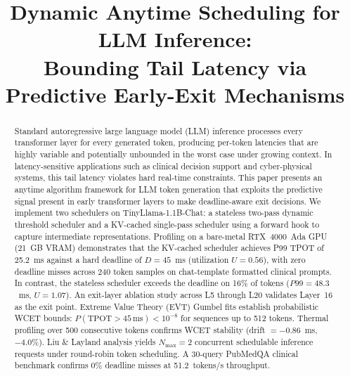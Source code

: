 \documentclass[conference]{IEEEtran}
\begin{document}
\title{Dynamic Anytime Scheduling for LLM Inference:\\
Bounding Tail Latency via Predictive Early-Exit Mechanisms}

\author{
}

\maketitle

\begin{abstract}
Standard autoregressive large language model (LLM) inference processes every transformer layer for every generated token, producing per-token latencies that are highly variable and potentially unbounded in the worst case under growing context. In latency-sensitive applications such as clinical decision support and cyber-physical systems, this tail latency violates hard real-time constraints. This paper presents an anytime algorithm framework for LLM token generation that exploits the predictive signal present in early transformer layers to make deadline-aware exit decisions. We implement two schedulers on TinyLlama-1.1B-Chat: a stateless two-pass dynamic threshold scheduler and a KV-cached single-pass scheduler using a forward hook to capture intermediate representations. Profiling on a bare-metal RTX~4000~Ada GPU (21~GB VRAM) demonstrates that the KV-cached scheduler achieves P99 TPOT of 25.2~ms against a hard deadline of $D = 45$~ms (utilization $U = 0.56$), with zero deadline misses across 240 token samples on chat-template formatted clinical prompts. In contrast, the stateless scheduler exceeds the deadline on 16\% of tokens ($P99 = 48.3$~ms, $U = 1.07$). An exit-layer ablation study across L5 through L20 validates Layer~16 as the exit point. Extreme Value Theory (EVT) Gumbel fits establish probabilistic WCET bounds: $P(\text{TPOT} > 45\,\text{ms}) < 10^{-8}$ for sequences up to 512 tokens. Thermal profiling over 500 consecutive tokens confirms WCET stability (drift $= -0.86$~ms, $-4.0\%$). Liu \& Layland analysis yields $N_{\max} = 2$ concurrent schedulable inference requests under round-robin token scheduling. A 30-query PubMedQA clinical benchmark confirms 0\% deadline misses at 51.2~tokens/s throughput.
\end{abstract}
\end{document}
